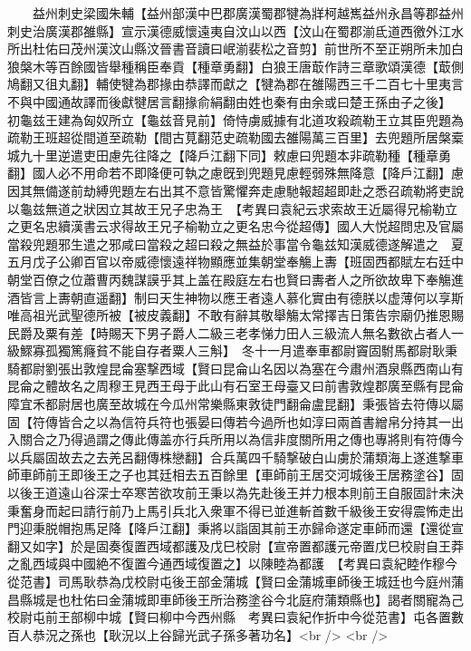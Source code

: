　　益州刺史梁國朱輔【益州部漢中巴郡廣漢蜀郡犍為牂柯越嶲益州永昌等郡益州刺史治廣漢郡雒縣】宣示漢德威懷遠夷自汶山以西【汶山在蜀郡湔氐道西徼外江水所出杜佑曰茂州漢汶山縣汶晉書音讀曰岷湔裴松之音剪】前世所不至正朔所未加白狼槃木等百餘國皆舉種稱臣奉貢【種章勇翻】白狼王唐菆作詩三章歌頌漢德【菆側鳩翻又徂丸翻】輔使犍為郡掾由恭譯而獻之【犍為郡在雒陽西三千二百七十里夷言不與中國通故譯而後獻犍居言翻掾俞絹翻由姓也秦有由余或曰楚王孫由子之後】　初龜兹王建為匈奴所立【龜兹音見前】倚恃虜威據有北道攻殺疏勒王立其臣兜題為疏勒王班超從間道至疏勒【間古莧翻范史疏勒國去雒陽萬三百里】去兜題所居槃槖城九十里逆遣吏田慮先往降之【降戶江翻下同】敕慮曰兜題本非疏勒種【種章勇翻】國人必不用命若不即降便可執之慮旣到兜題見慮輕弱殊無降意【降戶江翻】慮因其無備遂前劫縛兜題左右出其不意皆驚懼奔走慮馳報超超即赴之悉召疏勒將吏說以龜兹無道之狀因立其故王兄子忠為王　【考異曰袁紀云求索故王近屬得兄榆勒立之更名忠續漢書云求得故王兄子榆勒立之更名忠今從超傳】國人大悦超問忠及官屬當殺兜題邪生遣之邪咸曰當殺之超曰殺之無益於事當令龜兹知漢威德遂解遣之　夏五月戊子公卿百官以帝威德懷遠祥物顯應並集朝堂奉觴上夀【班固西都賦左右廷中朝堂百僚之位蕭曹丙魏謀謨乎其上盖在殿庭左右也賢曰夀者人之所欲故卑下奉觴進酒皆言上夀朝直遥翻】制曰天生神物以應王者遠人慕化實由有德朕以虚薄何以享斯唯高祖光武聖德所被【被皮義翻】不敢有辭其敬舉觴太常擇吉日策告宗廟仍推恩賜民爵及粟有差【時賜天下男子爵人二級三老孝悌力田人三級流人無名數欲占者人一級鰥寡孤獨篤癃貧不能自存者粟人三斛】　冬十一月遣奉車都尉竇固駙馬都尉耿秉騎都尉劉張出敦煌昆侖塞撃西域【賢曰昆侖山名因以為塞在今肅州酒泉縣西南山有昆侖之體故名之周穆王見西王母于此山有石室王母臺又曰前書敦煌郡廣至縣有昆侖障宜禾都尉居也廣至故城在今瓜州常樂縣東敦徒門翻侖盧昆翻】秉張皆去符傳以屬固【符傳皆合之以為信符兵符也張晏曰傳若今過所也如淳曰兩首書繒帛分持其一出入關合之乃得過謂之傳此傳盖亦行兵所用以為信非度關所用之傳也專將則有符傳今以兵屬固故去之去羌呂翻傳株戀翻】合兵萬四千騎撃破白山虜於蒲類海上遂進撃車師車師前王即後王之子也其廷相去五百餘里【車師前王居交河城後王居務塗谷】固以後王道遠山谷深士卒寒苦欲攻前王秉以為先赴後王并力根本則前王自服固計未決秉奮身而起曰請行前乃上馬引兵北入衆軍不得已並進斬首數千級後王安得震怖走出門迎秉脱帽抱馬足降【降戶江翻】秉將以詣固其前王亦歸命遂定車師而還【還從宣翻又如字】於是固奏復置西域都護及戊巳校尉【宣帝置都護元帝置戊巳校尉自王莽之亂西域與中國絶不復置今通西域復置之】以陳睦為都護　【考異曰袁紀睦作穆今從范書】司馬耿恭為戊校尉屯後王部金蒲城【賢曰金蒲城車師後王城廷也今庭州蒲昌縣城是也杜佑曰金蒲城即車師後王所治務塗谷今北庭府蒲類縣也】謁者關寵為己校尉屯前王部柳中城【賢曰柳中今西州縣　考異曰袁紀作折中今從范書】屯各置數百人恭況之孫也【耿況以上谷歸光武子孫多著功名】<br />
<br />
